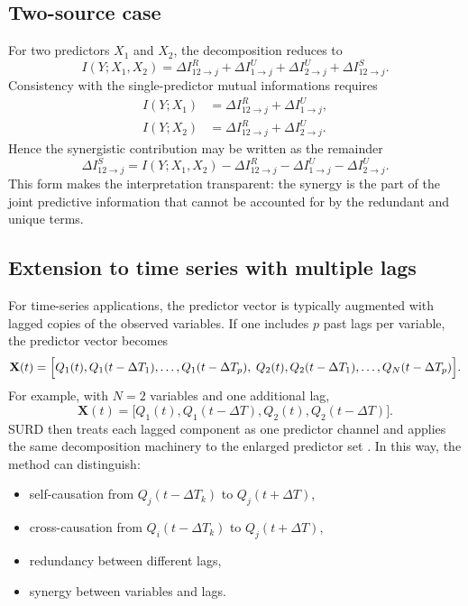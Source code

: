 \documentclass[12pt, a4paper]{article}
\begin{document}
\subsection{Two-source case}

For two predictors \(X_1\) and \(X_2\), the decomposition reduces to
\begin{equation}
I(Y;X_1,X_2)
=
\Delta I_{12\to j}^{R}
+
\Delta I_{1\to j}^{U}
+
\Delta I_{2\to j}^{U}
+
\Delta I_{12\to j}^{S}.
\label{eq:two_source_total}
\end{equation}
Consistency with the single-predictor mutual informations requires
\begin{align}
I(Y;X_1) &= \Delta I_{12\to j}^{R} + \Delta I_{1\to j}^{U},\\
I(Y;X_2) &= \Delta I_{12\to j}^{R} + \Delta I_{2\to j}^{U}.
\end{align}
Hence the synergistic contribution may be written as the remainder
\begin{equation}
\Delta I_{12\to j}^{S}
=
I(Y;X_1,X_2)
-
\Delta I_{12\to j}^{R}
-
\Delta I_{1\to j}^{U}
-
\Delta I_{2\to j}^{U}.
\end{equation}
This form makes the interpretation transparent: the synergy is the part of the joint predictive information that cannot be accounted for by the redundant and unique terms.

\subsection{Extension to time series with multiple lags}

For time-series applications, the predictor vector is typically augmented with lagged copies of the observed variables. If one includes \(p\) past lags per variable, the predictor vector becomes
\begin{equation}
\mathbf{X}(t)=
\Bigl[
Q_1(t),Q_1(t-\Delta T_1),\ldots,Q_1(t-\Delta T_p),\;
Q_2(t),Q_2(t-\Delta T_1),\ldots,Q_N(t-\Delta T_p)
\Bigr].
\label{eq:lagged_vector_general}
\end{equation}
For example, with \(N=2\) variables and one additional lag,
\begin{equation}
\mathbf{X}(t)=
\bigl[
Q_1(t),Q_1(t-\Delta T),Q_2(t),Q_2(t-\Delta T)
\bigr].
\label{eq:lagged_vector_two}
\end{equation}
SURD then treats each lagged component as one predictor channel and applies the same decomposition machinery to the enlarged predictor set \cite{MartinezSanchez2024SURD}. In this way, the method can distinguish:
\begin{itemize}
    \item self-causation from \(Q_j(t-\Delta T_k)\) to \(Q_j(t+\Delta T)\),
    \item cross-causation from \(Q_i(t-\Delta T_k)\) to \(Q_j(t+\Delta T)\),
    \item redundancy between different lags,
    \item synergy between variables and lags.
\end{itemize}
\end{document}
